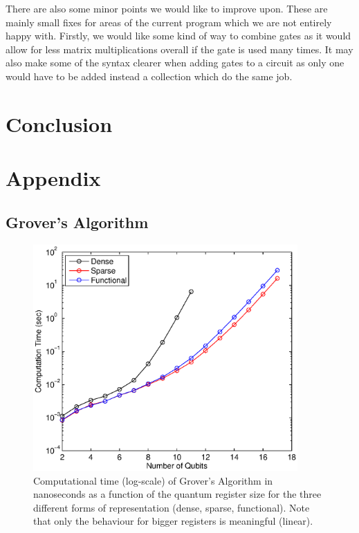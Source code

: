 \documentclass[bibliography=totocnumbered, 10pt]{article}
\theoremstyle{NoticeStyle}
\begin{document}
There are also some minor points we would like to improve upon. These are mainly small fixes for areas of the current program which we are not entirely happy with. Firstly, we would like some kind of way to combine gates as it would allow for less matrix multiplications overall if the gate is used many times. It may also make some of the syntax clearer when adding gates to a circuit as only one would have to be added instead a collection which do the same job.

%
\section{Conclusion}


%
\section{Appendix}

\subsection{Grover's Algorithm}

\begin{figure}[H]
	\centering
	\includegraphics[width=0.9\textwidth]{img/Grover_Time_Performance_log.eps}
	\caption{Computational time (log-scale) of Grover's Algorithm in nanoseconds as a function of the quantum register size for the three different forms of representation (dense, sparse, functional). Note that only the behaviour for bigger registers is meaningful (linear).}
	\label{grover_time_performance_log}
\end{figure}
\end{document}
